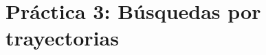 \documentclass[11pt,twoside,titlepage,a4paper]{book}
\numberwithin{equation}{section} %
\theoremstyle{usual}
\begin{document}

 





\chapter{Práctica 3: Búsquedas por trayectorias}




\end{document}
